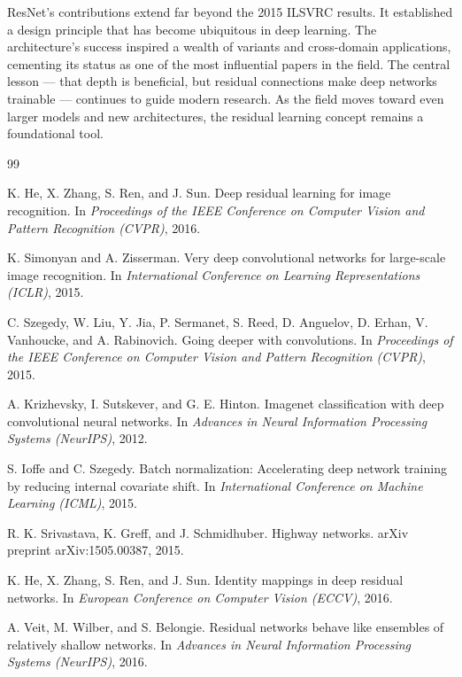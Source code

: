 \documentclass[11pt,a4paper]{article}
\begin{document}
ResNet's contributions extend far beyond the 2015 ILSVRC results. It established a design principle that has become ubiquitous in deep learning. The architecture's success inspired a wealth of variants and cross-domain applications, cementing its status as one of the most influential papers in the field. The central lesson — that depth is beneficial, but residual connections make deep networks trainable — continues to guide modern research. As the field moves toward even larger models and new architectures, the residual learning concept remains a foundational tool.

\begin{thebibliography}{99}

K. He, X. Zhang, S. Ren, and J. Sun.
\newblock Deep residual learning for image recognition.
\newblock In \emph{Proceedings of the IEEE Conference on Computer Vision and Pattern Recognition (CVPR)}, 2016.

K. Simonyan and A. Zisserman.
\newblock Very deep convolutional networks for large-scale image recognition.
\newblock In \emph{International Conference on Learning Representations (ICLR)}, 2015.

C. Szegedy, W. Liu, Y. Jia, P. Sermanet, S. Reed, D. Anguelov, D. Erhan, V. Vanhoucke, and A. Rabinovich.
\newblock Going deeper with convolutions.
\newblock In \emph{Proceedings of the IEEE Conference on Computer Vision and Pattern Recognition (CVPR)}, 2015.

A. Krizhevsky, I. Sutskever, and G. E. Hinton.
\newblock Imagenet classification with deep convolutional neural networks.
\newblock In \emph{Advances in Neural Information Processing Systems (NeurIPS)}, 2012.

S. Ioffe and C. Szegedy.
\newblock Batch normalization: Accelerating deep network training by reducing internal covariate shift.
\newblock In \emph{International Conference on Machine Learning (ICML)}, 2015.

R. K. Srivastava, K. Greff, and J. Schmidhuber.
\newblock Highway networks.
\newblock arXiv preprint arXiv:1505.00387, 2015.

K. He, X. Zhang, S. Ren, and J. Sun.
\newblock Identity mappings in deep residual networks.
\newblock In \emph{European Conference on Computer Vision (ECCV)}, 2016.

A. Veit, M. Wilber, and S. Belongie.
\newblock Residual networks behave like ensembles of relatively shallow networks.
\newblock In \emph{Advances in Neural Information Processing Systems (NeurIPS)}, 2016.


\end{thebibliography}
\end{document}

